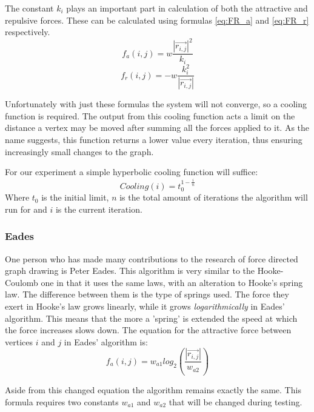 \documentclass[a4paper,12pt]{article}
\begin{document}
    The constant $k_{i}$ plays an important part in calculation of both the attractive and repulsive forces.
    These can be calculated using formulas \ref{eq:FR_a} and \ref{eq:FR_r} respectively.
    \begin{equation}\label{eq:FR_a}
      f_{a}(i,j) = w \frac{|\vec{r_{i,j}}|^2}{k_{i}}
    \end{equation}
    \begin{equation}\label{eq:FR_r}
      f_{r}(i,j) = - w \frac{k_{i}^2}{|\vec{r_{i,j}}|}
    \end{equation}

    Unfortunately with just these formulas the system will not converge, so a cooling function is required. The output from this cooling function acts a limit on the distance a vertex may be moved after summing all the forces applied to it. As the name suggests, this function returns a lower value every iteration, thus ensuring increasingly small changes to the graph.
    
    For our experiment a simple hyperbolic cooling function will suffice:
    \begin{equation}
	    Cooling(i) = t_{0}^{1 - \frac{i}{n}}
    \end{equation}
    Where $t_{0}$ is the initial limit, $n$ is the total amount of iterations the algorithm will run for and $i$ is the current iteration.

    \subsubsection{Eades}
    One person who has made many contributions to the research of force directed graph drawing is Peter Eades.
    This algorithm is very similar to the Hooke-Coulomb one in that it uses the same laws, with an alteration to Hooke's spring law.
    The difference between them is the type of springs used.
    The force they exert in Hooke's law grows linearly, while it grows \emph{logarithmically} in Eades' algorithm.
	This means that the more a 'spring' is extended the speed at which the force increases slows down.
    The equation for the attractive force between vertices $i$ and $j$ in Eades' algorithm is:
    \begin{equation}\label{eq:Eades_a}
      f_a(i,j) = w_{a1} log_{2}(\frac{|\vec{r_{i,j}}|}{w_{a2}})
    \end{equation}

    Aside from this changed equation the algorithm remains exactly the same.
    This formula requires two constants $w_{a1}$ and $w_{a2}$ that will be changed during testing. \cite{eades1984heuristic}
\end{document}
